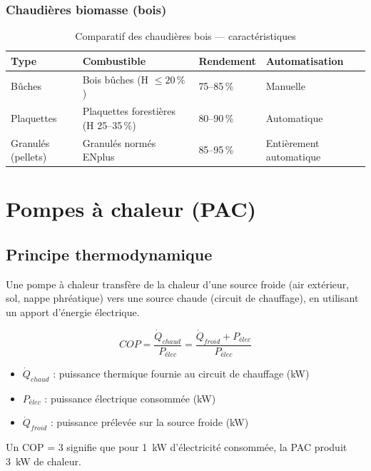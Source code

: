 \subsubsection{Chaudières biomasse (bois)}

\begin{table}[H]
  \centering
  \caption{Comparatif des chaudières bois — caractéristiques}
  \begin{tabular}{p{3cm}p{3.5cm}p{3.5cm}p{2.5cm}}
    \toprule
    Type & Combustible & Rendement & Automatisation \\
    \midrule
    Bûches & Bois bûches (H $\leq 20\,\%$) & 75–85\,\% & Manuelle \\
    Plaquettes & Plaquettes forestières (H 25–35\,\%) & 80–90\,\% & Automatique \\
    Granulés (pellets) & Granulés normés ENplus & 85–95\,\% & Entièrement automatique \\
    \bottomrule
  \end{tabular}
\end{table}

\section{Pompes à chaleur (PAC)}

\subsection{Principe thermodynamique}

Une pompe à chaleur transfère de la chaleur d'une source froide (air extérieur, sol, nappe phréatique) vers une source chaude (circuit de chauffage), en utilisant un apport d'énergie électrique.

\begin{definition}[title=Coefficient de performance (COP)]
\begin{equation}
  COP = \frac{\dot{Q}_{chaud}}{P_{élec}} = \frac{\dot{Q}_{froid} + P_{élec}}{P_{élec}}
  \label{eq:cop}
\end{equation}
\begin{itemize}
  \item $\dot{Q}_{chaud}$ : puissance thermique fournie au circuit de chauffage (\si{\kilo\watt})
  \item $P_{élec}$ : puissance électrique consommée (\si{\kilo\watt})
  \item $\dot{Q}_{froid}$ : puissance prélevée sur la source froide (\si{\kilo\watt})
\end{itemize}
Un COP = 3 signifie que pour \SI{1}{\kilo\watt} d'électricité consommée, la PAC produit \SI{3}{\kilo\watt} de chaleur.
\end{definition}

